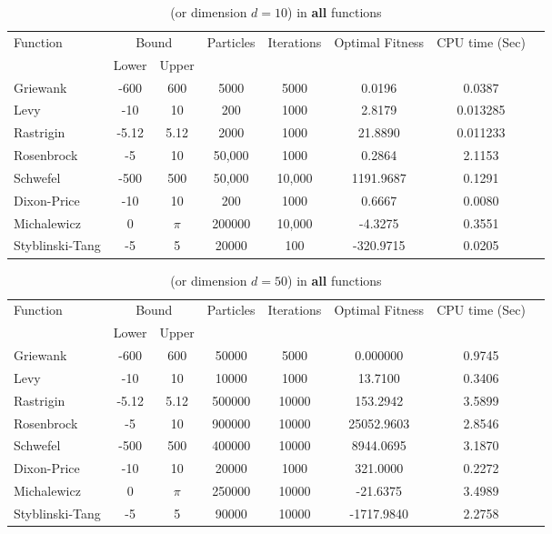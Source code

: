 \documentclass[12pt]{article}
\begin{document}
  \begin{table}[H]
		\caption{ (or dimension $d=10$) in \textbf{all} functions}
		\label{table:1}
		\centering
		\begin{tabular}{l c c c c c c c}
			\hline
			Function &  \multicolumn{2}{c}{Bound} & Particles & Iterations &  Optimal Fitness & CPU time (Sec) \\
			& Lower& Upper&&&\\
			\hline
			Griewank  		&  -600   & 600 	& 5000& 5000&  0.0196& 0.0387 &\\
			Levy 	  		&  -10    & 10 		&200 &1000 & 2.8179 &0.013285 &\\
			Rastrigin 		&  -5.12  & 5.12 	&2000 &1000 & 21.8890 & 0.011233&\\
			Rosenbrock		&  -5     & 10 		&50,000 &1000 & 0.2864 &2.1153 &\\
			Schwefel 	 	&  -500   & 500 	&50,000 &10,000 &1191.9687 &0.1291 &\\
			Dixon-Price 	&   -10	  & 10 		&200 &1000 &0.6667 &0.0080 &\\
			Michalewicz 	&   0 	  & $\pi$ 	&200000 &10,000 &-4.3275 &0.3551 &\\
			Styblinski-Tang & -5 	  & 5  		&20000 &100 &-320.9715 &0.0205 &\\
			\hline
		\end{tabular}
	\end{table}
	
	
	\begin{table}[H]
		\caption{ (or dimension $d=50$) in \textbf{all} functions}
		\label{table:1}
		\centering
		\begin{tabular}{l c c c c c c c}
			\hline
			Function &  \multicolumn{2}{c}{Bound} & Particles & Iterations &  Optimal Fitness & CPU time (Sec) \\
			& Lower& Upper&&&\\
			\hline
			Griewank  & -600 & 600 & 50000 & 5000 & 0.000000 & 0.9745  \\
			Levy      & -10  & 10  & 10000 & 1000 & 13.7100 & 0.3406\\
			Rastrigin & -5.12 & 5.12 & 500000 & 10000 & 153.2942 & 3.5899 \\
			Rosenbrock& -5   & 10  & 900000 & 10000 & 25052.9603 & 2.8546 \\
			Schwefel  & -500 & 500 & 400000 & 10000 & 8944.0695 & 3.1870\\
			Dixon-Price & -10 & 10  & 20000 & 1000 & 321.0000 & 0.2272 \\
			Michalewicz & 0  & $\pi$ & 250000 & 10000 & -21.6375 & 3.4989  \\
			Styblinski-Tang & -5 & 5 & 90000 & 10000 & -1717.9840 &  2.2758 \\
			\hline
		\end{tabular}
	\end{table}
	
\end{document}
